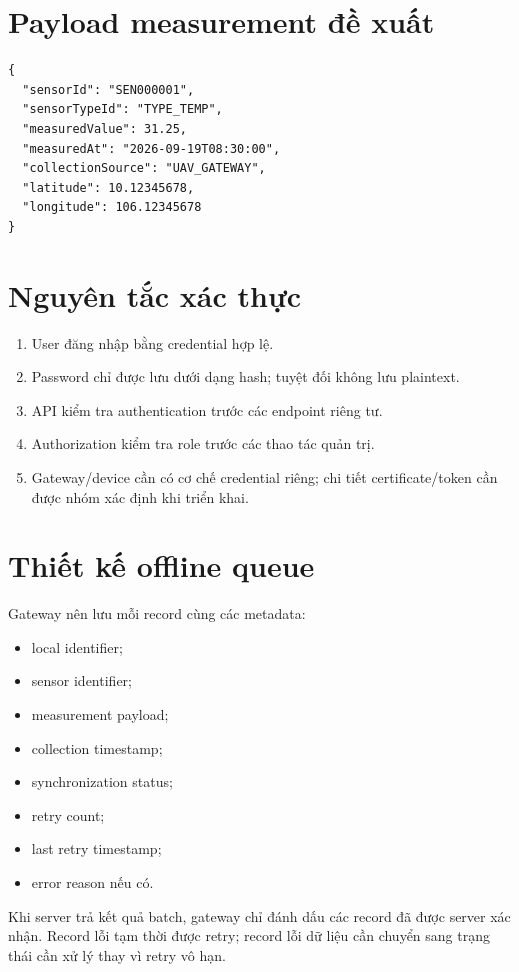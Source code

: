 \section{Payload measurement đề xuất}
\begin{lstlisting}
{
  "sensorId": "SEN000001",
  "sensorTypeId": "TYPE_TEMP",
  "measuredValue": 31.25,
  "measuredAt": "2026-09-19T08:30:00",
  "collectionSource": "UAV_GATEWAY",
  "latitude": 10.12345678,
  "longitude": 106.12345678
}
\end{lstlisting}

\section{Nguyên tắc xác thực}
\begin{enumerate}
  \item User đăng nhập bằng credential hợp lệ.
  \item Password chỉ được lưu dưới dạng hash; tuyệt đối không lưu plaintext.
  \item API kiểm tra authentication trước các endpoint riêng tư.
  \item Authorization kiểm tra role trước các thao tác quản trị.
  \item Gateway/device cần có cơ chế credential riêng; chi tiết certificate/token cần được nhóm xác định khi triển khai.
\end{enumerate}

\section{Thiết kế offline queue}
Gateway nên lưu mỗi record cùng các metadata:
\begin{itemize}
  \item local identifier;
  \item sensor identifier;
  \item measurement payload;
  \item collection timestamp;
  \item synchronization status;
  \item retry count;
  \item last retry timestamp;
  \item error reason nếu có.
\end{itemize}

Khi server trả kết quả batch, gateway chỉ đánh dấu các record đã được server xác nhận. Record lỗi tạm thời được retry; record lỗi dữ liệu cần chuyển sang trạng thái cần xử lý thay vì retry vô hạn.

